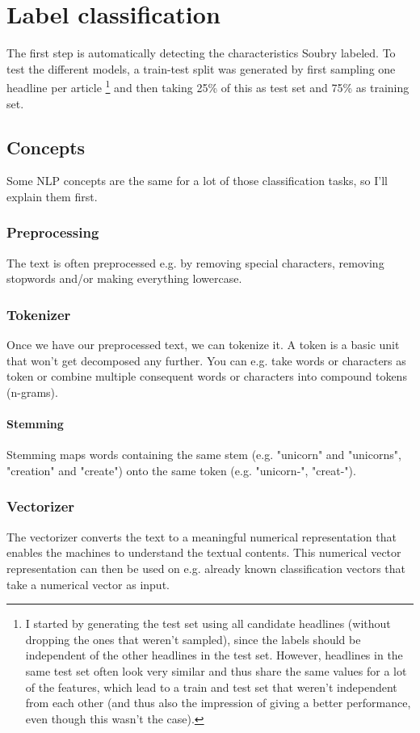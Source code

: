 \documentclass{article}
\begin{document}
\section{Label classification}
The first step is automatically detecting the characteristics Soubry \cite{soubry} labeled. To test the different models, a train-test split was generated by first sampling one headline per article \footnote{I started by generating the test set using all candidate headlines (without dropping the ones that weren't sampled), since the labels should be independent of the other headlines in the test set. However, headlines in the same test set often look very similar and thus share the same values for a lot of the features, which lead to a train and test set that weren't independent from each other (and thus also the impression of giving a better performance, even though this wasn't the case).} and then taking 25\% of this as test set and 75\% as training set.

\subsection{Concepts}
Some NLP concepts are the same for a lot of those classification tasks, so I'll explain them first.

\subsubsection{Preprocessing}
The text is often preprocessed e.g. by removing special characters, removing stopwords and/or making everything lowercase.

\subsubsection{Tokenizer}
Once we have our preprocessed text, we can tokenize it. A token is a basic unit that won't get decomposed any further. You can e.g. take words or characters as token or combine multiple consequent words or characters into compound tokens (n-grams). \cite{webster1992tokenization}

\paragraph{Stemming}
Stemming maps words containing the same stem (e.g. "unicorn" and "unicorns", "creation" and "create") onto the same token (e.g. "unicorn-", "creat-").  \cite{patel2021fake}

\subsubsection{Vectorizer}
The vectorizer converts the text to a meaningful numerical representation that enables the machines to understand the textual contents. \cite{singh2019vectorization} This numerical vector representation can then be used on e.g. already known classification vectors that take a numerical vector as input.
\end{document}
